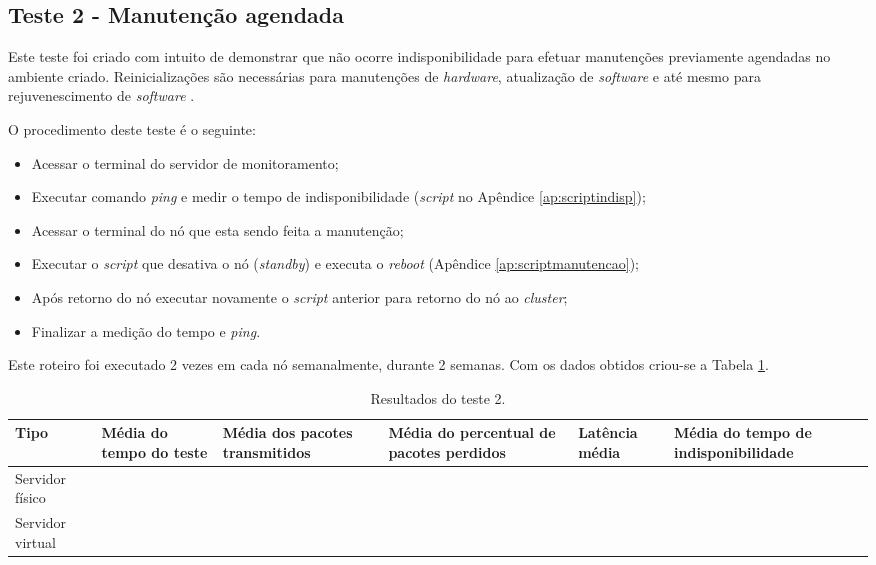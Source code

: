 \subsection{Teste 2 - Manutenção agendada}

Este teste foi criado com intuito de demonstrar que não ocorre indisponibilidade para efetuar manutenções previamente agendadas no ambiente criado.
Reinicializações são necessárias para manutenções de \textit{hardware}, atualização de \textit{software} e até mesmo para rejuvenescimento de
\textit{software} \cite{melo2014}.

O procedimento deste teste é o seguinte:
\begin{itemize}
 \item Acessar o terminal do servidor de monitoramento;
 \item Executar comando \textit{ping} e medir o tempo de indisponibilidade (\textit{script} no Apêndice \ref{ap:scriptindisp});
 \item Acessar o terminal do nó que esta sendo feita a manutenção;
 \item Executar o \textit{script} que desativa o nó (\textit{standby}) e executa o \textit{reboot} (Apêndice \ref{ap:scriptmanutencao});
 \item Após retorno do nó executar novamente o \textit{script} anterior para retorno do nó ao \textit{cluster};
 \item Finalizar a medição do tempo e \textit{ping}.
\end{itemize}

Este roteiro foi executado 2 vezes em cada nó semanalmente, durante 2 semanas. Com os dados obtidos criou-se a Tabela \ref{tab:teste2resultados}.

\begin{table}[h!]
\caption{Resultados do teste 2.}
\label{tab:teste2resultados}
\begin{center}
\begin{tabular}{|l|p{2.5cm}|p{2.5cm}|p{2.5cm}|p{2.5cm}|p{3cm}|}\hline
\textbf{Tipo} & \textbf{Média do tempo do teste} & \textbf{Média dos pacotes transmitidos} & \textbf{Média do percentual de pacotes perdidos} & \textbf{Latência média} & \textbf{Média do tempo de indisponibilidade} \\\hline
Servidor físico & & & & & \\\hline
Servidor virtual & & & & & \\\hline
\end{tabular}
\end{center}
\end{table}

